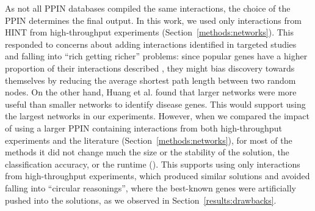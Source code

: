 \documentclass[10pt,letterpaper]{article}
\begin{document}
As not all PPIN databases compiled the same interactions, the choice of the PPIN determines the final output. In this work, we used only interactions from HINT from high-throughput experiments (Section~\ref{methods:networks}). This responded to concerns about adding interactions identified in targeted studies and falling into ``rich getting richer'' problems: since popular genes have a higher proportion of their interactions described \cite{cai_broker_2010,das_hint:_2012}, they might bias discovery towards themselves by reducing the average shortest path length between two random nodes. On the other hand, Huang et al. \cite{huang_systematic_2018} found that larger networks were more useful than smaller networks to identify disease genes. This would support using the largest networks in our experiments. However, when we compared the impact of using a larger PPIN containing interactions from both high-throughput experiments and the literature (Section~\ref{methods:networks}), for most of the methods it did not change much the size or the stability of the solution, the classification accuracy, or the runtime (). This supports using only interactions from high-throughput experiments, which produced similar solutions and avoided falling into ``circular reasonings'', where the best-known genes were artificially pushed into the solutions, as we observed in Section~\ref{results:drawbacks}. 
\end{document}
